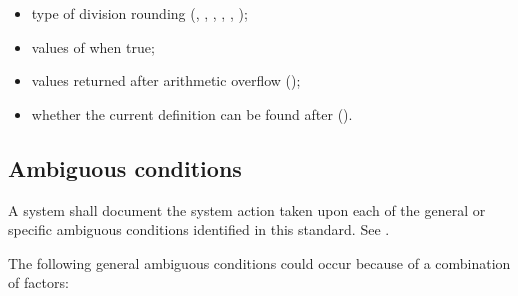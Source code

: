 \begin{itemize}
\item type of division rounding (,
	, , ,
	, );

\item values of  when true;

\item values returned after arithmetic overflow
	();

\item whether the current definition can be found after
	 ().

\end{itemize}



\subsection{Ambiguous conditions} %
\label{doc:ambiguous}

A system shall document the system action taken upon each of the
general or specific ambiguous conditions identified in this
standard. See .

The following general ambiguous conditions could occur because of a
combination of factors:


